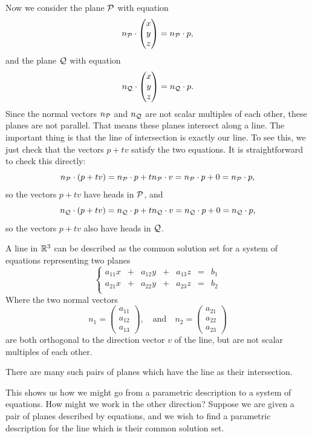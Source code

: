 \documentclass[00-livre-main.tex]{subfiles}
\begin{document}
Now we consider the plane $\mathcal{P}$ with equation
\[
n_{\mathcal{P}} \cdot  \begin{pmatrix} x \\ y \\ z \end{pmatrix}  = n_{\mathcal{P}}\cdot p ,
\]
and the plane $\mathcal{Q}$ with equation
\[
n_{\mathcal{Q}} \cdot  \begin{pmatrix} x \\ y \\ z \end{pmatrix}  = n_{\mathcal{Q}}\cdot p .
\]
Since the normal vectors $n_{\mathcal{P}}$ and $n_{\mathcal{Q}}$ are not scalar multiples of each other, these planes are not parallel. That means these planes intersect along a line. The important thing is that the line of intersection is exactly our line. To see this, we just check that the vectors $p+t v$ satisfy the two equations. It is straightforward to check this directly:
\[
n_{\mathcal{P}} \cdot (p + tv) = n_{\mathcal{P}} \cdot p + t n_{\mathcal{P}}\cdot v = n_{\mathcal{P}}\cdot p + 0 = n_{\mathcal{P}}\cdot p,
\]
so the vectors $p+tv$ have heads in $\mathcal{P}$, and 
\[
n_{\mathcal{Q}} \cdot (p + tv) = n_{\mathcal{Q}} \cdot p + t n_{\mathcal{Q}}\cdot v = n_{\mathcal{Q}}\cdot p + 0 = n_{\mathcal{Q}}\cdot p,
\]
so the vectors $p+tv$ also have heads in $\mathcal{Q}$.

\begin{theorem}
A line in $\mathbb{R}^3$ can be described as the common solution set for a system of equations representing two planes
\[
\left\{\begin{array}{rrrrrrr}
a_{11} x &+& a_{12}y &+& a_{13} z &=& b_1 \\
a_{21} x &+& a_{22}y &+& a_{23} z &=& b_2 \\
\end{array}\right.
\]
Where the two normal vectors
\[
n_1 = \begin{pmatrix} a_{11} \\ a_{12} \\ a_{13} \end{pmatrix}, \quad \text{and} \quad
n_2 = \begin{pmatrix} a_{21} \\ a_{22} \\ a_{23} \end{pmatrix}
\]
are both orthogonal to the direction vector $v$ of the line, but are not scalar multiples of each other.

There are many such pairs of planes which have the line as their intersection.
\end{theorem}


This shows us how we might go from a parametric description to a system of equations. How might we work in the other direction? Suppose we are given a pair of planes described by equations, and we wish to find a parametric description for the line which is their common solution set.
\end{document}
